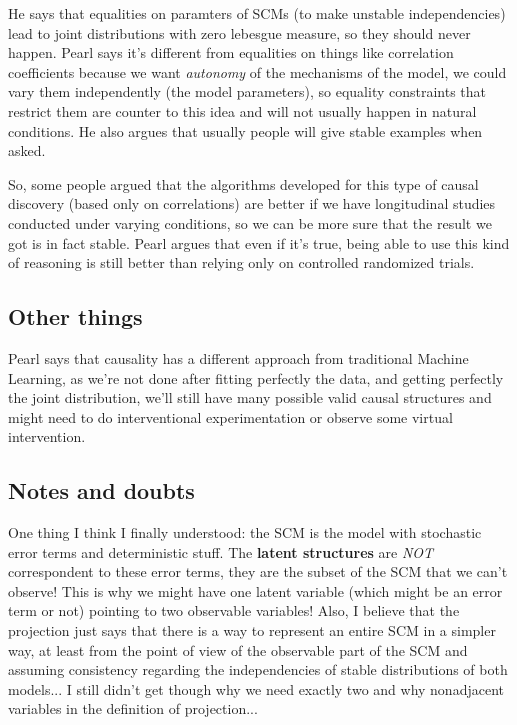 He says that equalities on paramters of SCMs (to make unstable independencies) lead to joint distributions with zero lebesgue measure, so they should never happen. Pearl says it's different from equalities on things like correlation coefficients because we want \textit{autonomy} of the mechanisms of the model, we could vary them independently (the model parameters), so equality constraints that restrict them are counter to this idea and will not usually happen in natural conditions. He also argues that usually people will give stable examples when asked.

So, some people argued that the algorithms developed for this type of causal discovery (based only on correlations) are better if we have longitudinal studies conducted under varying conditions, so we can be more sure that the result we got is in fact stable. Pearl argues that even if it's true, being able to use this kind of reasoning is still better than relying only on controlled randomized trials.


\subsection{Other things}

Pearl says that causality has a different approach from traditional Machine Learning, as we're not done after fitting perfectly the data, and getting perfectly the joint distribution, we'll still have many possible valid causal structures and might need to do interventional experimentation or observe some virtual intervention.

\subsection{Notes and doubts}

One thing I think I finally understood: the SCM is the model with stochastic error terms and deterministic stuff. The \textbf{latent structures} are \textit{NOT} correspondent to these error terms, they are the subset of the SCM that we can't observe! This is why we might have one latent variable (which might be an error term or not) pointing to two observable variables! Also, I believe that the projection just says that there is a way to represent an entire SCM in a simpler way, at least from the point of view of the observable part of the SCM and assuming consistency regarding the independencies of stable distributions of both models... I still didn't get though why we need exactly two and why nonadjacent variables in the definition of projection...

